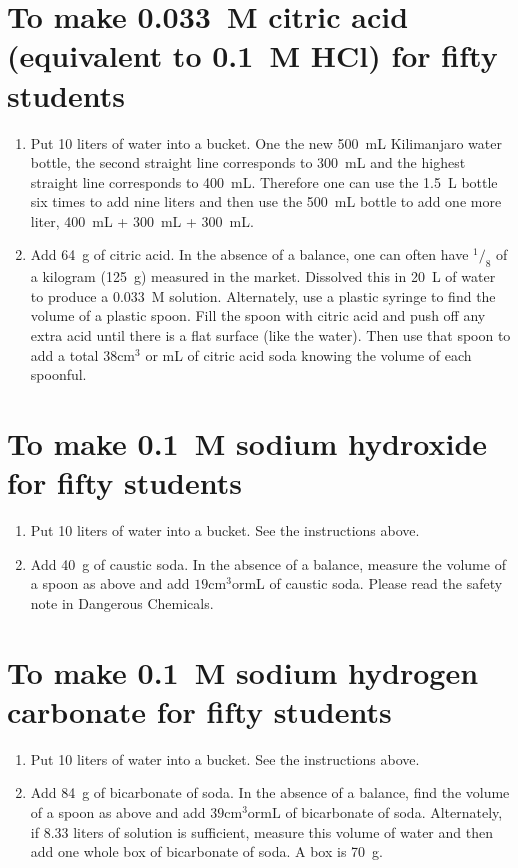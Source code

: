 \section{To make 0.033~M citric acid (equivalent to 0.1~M HCl) for fifty students}
\begin{enumerate}
\item{Put 10 liters of water into a bucket. One the new 500~mL Kilimanjaro water bottle, the second straight line corresponds to 300~mL and the highest straight line corresponds to 400~mL. Therefore one can use the 1.5~L bottle six times to add nine liters and then use the 500~mL bottle to add one more liter, 400~mL + 300~mL + 300~mL.}
\item{Add 64~g of citric acid. In the absence of a balance, one can often have $^1/_8$ of a kilogram (125~g) measured in the market. Dissolved this in 20~L of water to produce a 0.033~M solution. Alternately, use a plastic syringe to find the volume of a plastic spoon. Fill the spoon with citric acid and push off any extra acid until there is a flat surface (like the water). Then use that spoon to add a total $38 \mathrm{cm}^3$ or mL of citric acid soda knowing the volume of each spoonful.}
\end{enumerate}

\section{To make 0.1~M sodium hydroxide for fifty students}
\begin{enumerate}
\item{Put 10 liters of water into a bucket. See the instructions above.}
\item{Add 40~g of caustic soda. In the absence of a balance, measure the volume of a spoon as above and add $19 \mathrm{cm}^3 \mathrm{or mL}$ of caustic soda. Please read the safety note in Dangerous Chemicals.}
\end{enumerate}

\section{To make 0.1~M sodium hydrogen carbonate for fifty students}
\begin{enumerate}
\item{Put 10 liters of water into a bucket. See the instructions above.}
\item{Add 84~g of bicarbonate of soda. In the absence of a balance, find the volume of a spoon as above and add $39 \mathrm{cm}^3 \mathrm{or mL}$ of bicarbonate of soda. Alternately, if 8.33 liters of solution is sufficient, measure this volume of water and then add one whole box of bicarbonate of soda. A box is 70~g.}
\end{enumerate}
